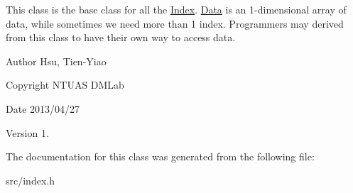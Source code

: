 This class is the base class for all the \hyperlink{class_x_1_1_index}{Index}. \hyperlink{class_x_1_1_data}{Data} is an 1-\/dimensional array of data, while sometimes we need more than 1 index. Programmers may derived from this class to have their own way to access data. 

\begin{DoxyAuthor}{Author}
Hsu, Tien-\/\-Yiao 
\end{DoxyAuthor}
\begin{DoxyCopyright}{Copyright}
N\-T\-U\-A\-S D\-M\-Lab 
\end{DoxyCopyright}
\begin{DoxyDate}{Date}
2013/04/27 
\end{DoxyDate}
\begin{DoxyVersion}{Version}
1. 
\end{DoxyVersion}


The documentation for this class was generated from the following file\-:\begin{DoxyCompactItemize}
\item 
src/index.\-h\end{DoxyCompactItemize}
